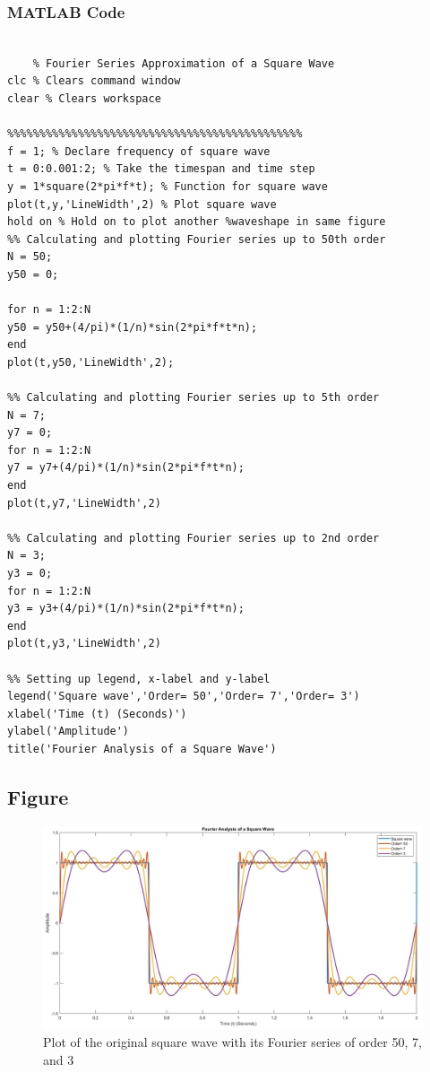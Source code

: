 \documentclass[a4paper,12pt]{article}
\begin{document}
\subsubsection*{MATLAB Code}
\begin{lstlisting}[style=vscode-light, caption={Fourier Series Approximation of a Square Wave} ]

	% Fourier Series Approximation of a Square Wave
clc % Clears command window
clear % Clears workspace

%%%%%%%%%%%%%%%%%%%%%%%%%%%%%%%%%%%%%%%%%%%%%%
f = 1; % Declare frequency of square wave
t = 0:0.001:2; % Take the timespan and time step
y = 1*square(2*pi*f*t); % Function for square wave
plot(t,y,'LineWidth',2) % Plot square wave
hold on % Hold on to plot another %waveshape in same figure
%% Calculating and plotting Fourier series up to 50th order
N = 50;
y50 = 0;

for n = 1:2:N
y50 = y50+(4/pi)*(1/n)*sin(2*pi*f*t*n);
end
plot(t,y50,'LineWidth',2);

%% Calculating and plotting Fourier series up to 5th order
N = 7;
y7 = 0;
for n = 1:2:N
y7 = y7+(4/pi)*(1/n)*sin(2*pi*f*t*n);
end
plot(t,y7,'LineWidth',2)

%% Calculating and plotting Fourier series up to 2nd order
N = 3;
y3 = 0;
for n = 1:2:N
y3 = y3+(4/pi)*(1/n)*sin(2*pi*f*t*n);
end
plot(t,y3,'LineWidth',2)

%% Setting up legend, x-label and y-label
legend('Square wave','Order= 50','Order= 7','Order= 3')
xlabel('Time (t) (Seconds)')
ylabel('Amplitude')
title('Fourier Analysis of a Square Wave')

\end{lstlisting}

\subsection{Figure}

\begin{figure}[H]
	\centering
	\includegraphics[width=1\linewidth]{Images/fourier_series4}
	\caption{Plot of the original square wave with its Fourier series of order 50, 7, and 3}
	\label{fig:screenshot002}
\end{figure}
\end{document}
